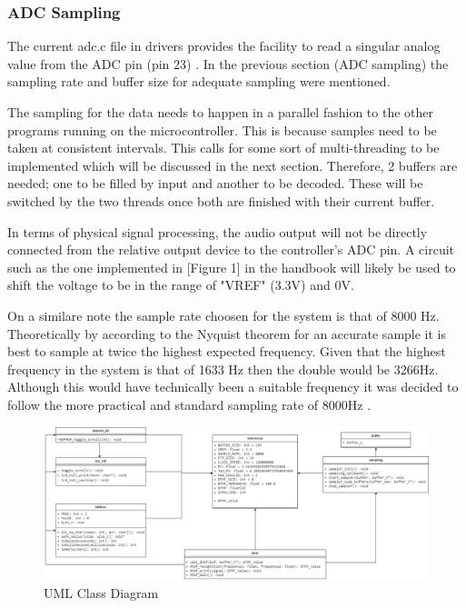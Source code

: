 \documentclass{cce2014-design}
\begin{document}
\subsubsection{ADC Sampling}
The current adc.c file in drivers provides the facility to read a singular
analog value from the ADC pin (pin 23)\cite{LPC4088} \cite{BaseBoard}. 
In the previous section (ADC sampling) the sampling rate and buffer size 
for adequate sampling were mentioned.

The sampling for the data needs to happen in a parallel fashion to the other
programs running on the microcontroller. This is because samples need to be
taken at consistent intervals. This calls for some sort of multi-threading to be
implemented which will be discussed in the next section. Therefore, 2 buffers are
needed; one to be filled by input and another to be decoded. These will be
switched by the two threads once both are finished with their current buffer.

In terms of physical signal processing, the audio output will not be directly
connected from the relative output device to the controller's ADC pin. A circuit
such as the one implemented in [Figure 1] in the handbook will likely be used to
shift the voltage to be in the range of "VREF" (3.3V) and 0V.

On a similare note the sample rate choosen for the system is that of 8000 Hz.
Theoretically by according to the Nyquist theorem for an accurate sample it is
best to sample at twice the highest expected frequency. Given that the highest
frequency in the system is that of 1633 Hz then the double would be 3266Hz.
Although this would have technically been a suitable frequency it was decided
to follow the more practical and standard sampling rate of 8000Hz \cite{itu-g711}.

\begin{figure}[t]
	\center
	\includegraphics[width=\textwidth]{img/UML DTMF.png}
    \caption{\label{UMLdiag}UML Class Diagram}
\end{figure}
\end{document}
